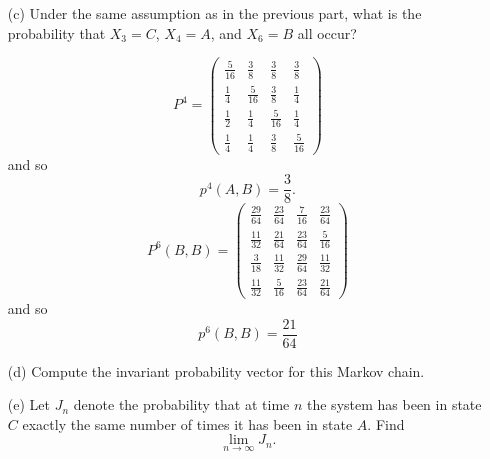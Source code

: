 \documentclass[11pt]{article}
\begin{document}
\begin{problem}
\begin{enumerate}
\begin{solution}
\end{solution}
    \item[(c)] Under the same assumption as in the previous part, what is the probability that \( X_3 = C \), \( X_4 = A \), and \( X_6 = B \) all occur?
\begin{solution}
    \[P^4 = 
\begin{pmatrix}
\frac{5}{16} & \frac{3}{8} & \frac{3}{8} & \frac{3}{8} \\
\frac{1}{4} & \frac{5}{16} & \frac{3}{8} & \frac{1}{4} \\
\frac{1}{2} & \frac{1}{4} & \frac{5}{16} & \frac{1}{4} \\
\frac{1}{4} & \frac{1}{4} & \frac{3}{8} & \frac{5}{16}
\end{pmatrix}
\]
and so 
\[\boxed{p^4(A, B)} = \frac{3}{8}.\]
\[P^6(B, B) = \begin{pmatrix}
    \frac{29}{64} & \frac{23}{64} & \frac{7}{16} & \frac{23}{64}\\
    \frac{11}{32} & \frac{21}{64} & \frac{23}{64} & \frac{5}{16}\\
    \frac{3}{18} & \frac{11}{32} & \frac{29}{64} & \frac{11}{32}\\
    \frac{11}{32} &\frac{5}{16} & \frac{23}{64} & \frac{21}{64}
\end{pmatrix}\]
and so 
\[\boxed{p^6(B,B) = \frac{21}{64}}\]
\end{solution}
    \item[(d)] Compute the invariant probability vector for this Markov chain.
    \item[(e)] Let \( J_n \) denote the probability that at time \( n \) the system has been in state \( C \) exactly the same number of times it has been in state \( A \). Find
    \[
    \lim_{n \to \infty} J_n.
    \]
\end{enumerate}
\end{problem}
\end{document}
